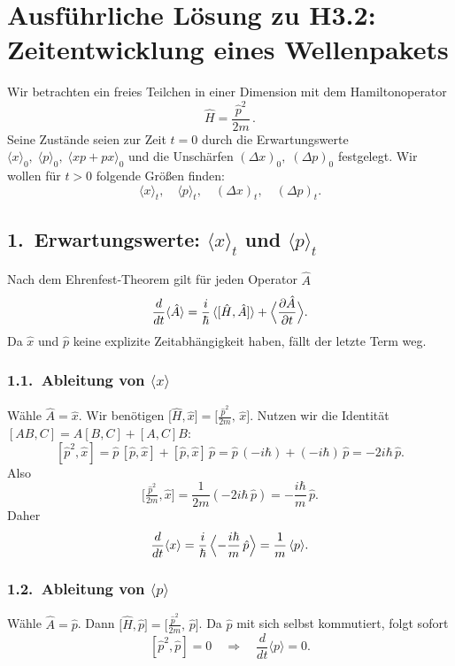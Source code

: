 \documentclass[a4paper,12pt]{article}
\begin{document}
\section*{Ausführliche Lösung zu H3.2: Zeitentwicklung eines Wellenpakets}

Wir betrachten ein freies Teilchen in einer Dimension mit dem Hamiltonoperator
\[
  \hat H = \frac{\hat p^2}{2m}\,.
\]
Seine Zustände seien zur Zeit \(t=0\) durch die Erwartungswerte
\(\langle x\rangle_0,\;\langle p\rangle_0,\;\langle xp+px\rangle_0\)
und die Unschärfen
\((\Delta x)_0,\;(\Delta p)_0\)
festgelegt. Wir wollen für \(t>0\) folgende Größen finden:
\[
  \langle x\rangle_t,\quad \langle p\rangle_t,\quad (\Delta x)_t,\quad (\Delta p)_t.
\]

\subsection*{1.\ Erwartungswerte: \(\langle x\rangle_t\) und \(\langle p\rangle_t\)}

Nach dem Ehrenfest‐Theorem gilt für jeden Operator \(\hat A\)
\[
  \frac{d}{dt}\langle \hat A\rangle
  = \frac{i}{\hbar}\,\langle [\hat H,\hat A]\rangle
  + \Bigl\langle \frac{\partial\hat A}{\partial t}\Bigr\rangle.
\]
Da \(\hat x\) und \(\hat p\) keine explizite Zeitabhängigkeit haben,
fällt der letzte Term weg.

\subsubsection*{1.1.\ Ableitung von \(\langle x\rangle\)}
Wähle \(\hat A = \hat x\). Wir benötigen
\(\bigl[\hat H,\hat x\bigr] = \bigl[\tfrac{\hat p^2}{2m},\,\hat x\bigr]\).
Nutzen wir die Identität \([AB,C]=A[B,C]+[A,C]B\):
\[
  [\hat p^2,\hat x]
  = \hat p\,[\hat p,\hat x] + [\hat p,\hat x]\,\hat p
  = \hat p\,(-i\hbar) + (-i\hbar)\,\hat p
  = -2i\hbar\,\hat p.
\]
Also
\[
  \bigl[\tfrac{\hat p^2}{2m},\hat x\bigr]
  = \frac{1}{2m}(-2i\hbar\,\hat p)
  = -\frac{i\hbar}{m}\,\hat p.
\]
Daher
\[
  \frac{d}{dt}\langle x\rangle
  = \frac{i}{\hbar}\,\Bigl\langle -\frac{i\hbar}{m}\,\hat p\Bigr\rangle
  = \frac{1}{m}\,\langle p\rangle.
\]

\subsubsection*{1.2.\ Ableitung von \(\langle p\rangle\)}
Wähle \(\hat A = \hat p\). Dann
\(\bigl[\hat H,\hat p\bigr] = \bigl[\tfrac{\hat p^2}{2m},\,\hat p\bigr]\).
Da \(\hat p\) mit sich selbst kommutiert, folgt sofort
\[
  [\hat p^2,\hat p] = 0
  \quad\Longrightarrow\quad
  \frac{d}{dt}\langle p\rangle = 0.
\]
\end{document}
